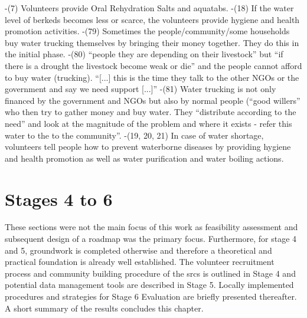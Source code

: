 -(7) Volunteers provide Oral Rehydration Salts and aquatabs.
-(18) If the water level of berkeds becomes less or scarce, the volunteers provide hygiene and health promotion activities.
-(79) Sometimes the people/community/some households buy water trucking themselves by bringing their money together. They do this in the initial phase.
-(80) “people they are depending on their livestock” but “if there is a drought the livestock become weak or die” and the people cannot afford to buy water (trucking). “[...] this is the time they talk to the other NGOs or the government and say we need support [...]”
-(81) Water trucking is not only financed by the government and NGOs but also by normal people (“good willers” who then try to gather money and buy water. They “distribute according to the need” and look at the magnitude of the problem and where it exists - refer this water to the to the community”.
-(19, 20, 21) In case of water shortage, volunteers tell people how to prevent waterborne diseases by providing hygiene and health promotion as well as water purification and water boiling actions.




\section{Stages 4 to 6}
These sections were not the main focus of this work as feasibility assessment and subsequent design of a roadmap was the primary focus. Furthermore, for stage 4 and 5, groundwork is completed otherwise and therefore a theoretical and practical foundation is already well established. The volunteer recruitment process and community building procedure of the \acrshort*{srcs} is outlined in Stage 4 and potential data management tools are described in Stage 5. Locally implemented procedures and strategies for Stage 6 Evaluation are briefly presented thereafter. A short summary of the results concludes this chapter.

